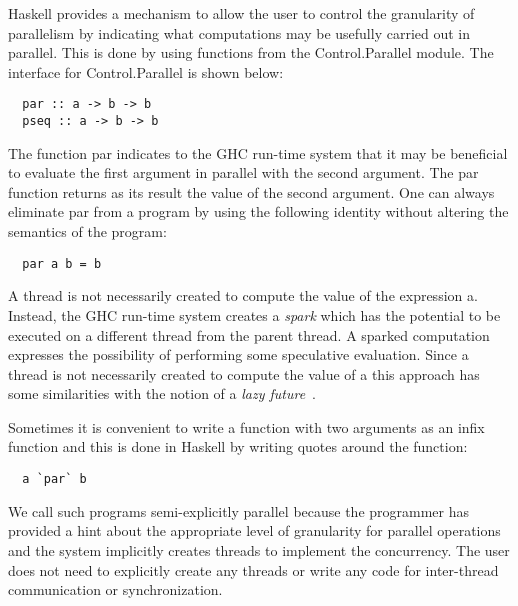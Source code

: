 \documentclass[twocolumn,9pt]{sigplanconf}
\newcommand{\codef}[1]{{\fontfamily{cmss}\small#1}}
\begin{document}
Haskell provides a mechanism to allow the user to control the granularity of parallelism by indicating what computations may be usefully carried out in parallel. This is done by using functions from the \codef{Control.Parallel} module. The interface for \codef{Control.Parallel} is shown below:
\begin{lstlisting}
  par :: a -> b -> b 
  pseq :: a -> b -> b 
\end{lstlisting}
The function \codef{par} indicates to the GHC run-time system that it may be beneficial to evaluate the first argument in parallel with the second argument. The \codef{par} function returns as its result the value of the second argument. One can always eliminate \codef{par} from a program by using the following identity without altering the semantics of the program:
\begin{lstlisting}
  par a b = b 
\end{lstlisting}
A thread is not necessarily created to compute the value of the expression \codef{a}. Instead, the GHC run-time system creates a {\em spark} which has the potential to be executed on a different thread from the parent thread. A sparked computation expresses the possibility of performing some speculative evaluation. Since a thread is not necessarily created to compute the value of \codef{a} this approach has some similarities with the notion of a {\em lazy future}~\cite{mohr:91}.

Sometimes it is convenient to write a function with two arguments as an infix function and this is done in Haskell by writing quotes around the function:
\begin{lstlisting}
  a `par` b
\end{lstlisting}

We call such programs semi-explicitly parallel because the programmer has provided a hint about the appropriate level of granularity for parallel operations and the system implicitly creates threads to implement the concurrency. The user does not need to explicitly create any threads or write any code for inter-thread communication or synchronization.
\end{document}
